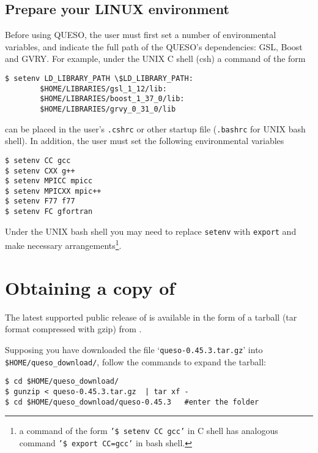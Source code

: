 \subsection{Prepare your LINUX environment}\label{sec:prepare}



Before using QUESO, the user must first set a number of environmental variables, and indicate the full path
of the QUESO's dependencies: GSL, Boost and GVRY. For example, under the UNIX C shell (csh) a command of the form
\begin{lstlisting}
$ setenv LD_LIBRARY_PATH \$LD_LIBRARY_PATH:
		$HOME/LIBRARIES/gsl_1_12/lib:
		$HOME/LIBRARIES/boost_1_37_0/lib:
		$HOME/LIBRARIES/grvy_0_31_0/lib
\end{lstlisting}
can be placed in the user's \verb+.cshrc+ or other startup file (\verb+.bashrc+ for UNIX bash shell). In addition, the user must set the following environmental
variables
\begin{lstlisting}
$ setenv CC gcc
$ setenv CXX g++
$ setenv MPICC mpicc
$ setenv MPICXX mpic++
$ setenv F77 f77
$ setenv FC gfortran 
\end{lstlisting}

Under the UNIX bash shell you may need to replace \texttt{setenv} with \texttt{export} and make necessary arrangements\footnote{a command of the form \texttt{'\$ setenv CC gcc'} in C shell has analogous command \texttt{'\$ export CC=gcc'} in bash shell.}.

\section{Obtaining a copy of \Queso{}}

The latest supported public release of \Queso{} is available in the form of a tarball (tar format compressed with gzip) from \Quesoweb{}.

Supposing you have downloaded the file `\verb+queso-0.45.3.tar.gz+' into \texttt{\$HOME/queso\_download/}, follow the commands to expand the tarball:
\begin{lstlisting}
$ cd $HOME/queso_download/
$ gunzip < queso-0.45.3.tar.gz  | tar xf -
$ cd $HOME/queso_download/queso-0.45.3   #enter the folder 
\end{lstlisting}

